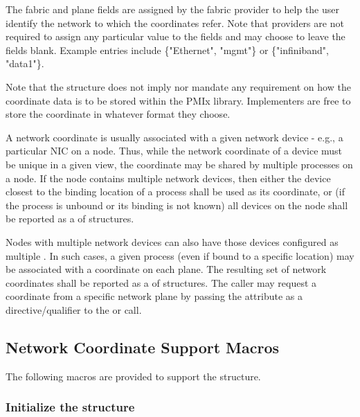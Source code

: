 The fabric and plane fields are assigned by the fabric provider to help the user identify the network to which the coordinates refer. Note that providers are not required to assign any particular value to the fields and may choose to leave the fields blank. Example entries include \{"Ethernet", "mgmt"\} or \{"infiniband", "data1"\}.

\adviceimplstart
Note that the  structure does not imply nor mandate any requirement on how the coordinate data is to be stored within the \ac{PMIx} library. Implementers are free to store the coordinate in whatever format they choose.
\adviceimplend

A network coordinate is usually associated with a given network device - e.g., a particular \ac{NIC} on a node. Thus, while the network coordinate of a device must be unique in a given view, the coordinate may be shared by multiple processes on a node. If the node contains multiple network devices, then either the device closest to the binding location of a process shall be used as its coordinate, or (if the process is unbound or its binding is not known) all devices on the node shall be reported as a  of  structures.

Nodes with multiple network devices can also have those devices configured as multiple . In such cases, a given process (even if bound to a specific location) may be associated with a coordinate on each plane. The resulting set of network coordinates shall be reported as a  of  structures. The caller may request a coordinate from a specific network plane by passing the  attribute as a directive/qualifier to the  or  call.

\subsection{Network Coordinate Support Macros}
\label{api:netcoord:macros}

The following macros are provided to support the  structure.

\subsubsection{Initialize the  structure}

